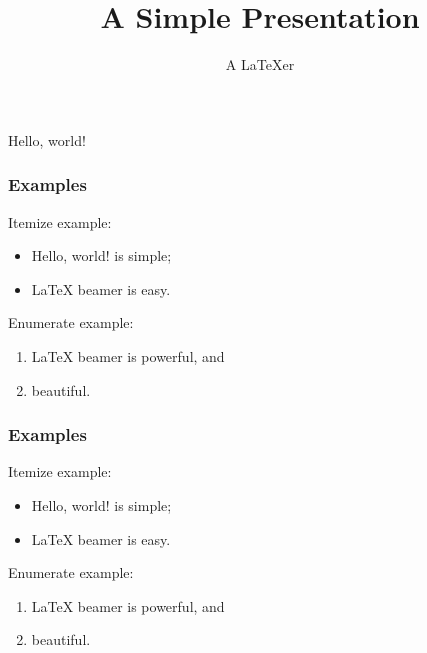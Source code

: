 \documentclass{beamer}
\begin{document}
\title{A Simple Presentation}
\author{A \LaTeX{}er}

\begin{frame}
  \titlepage
\end{frame}

\begin{frame}{Hello, world!}

\end{frame}

 \begin{frame}\frametitle{Examples}
   Itemize example:
   \begin{itemize}
   \item Hello, world! is simple;
   \item \LaTeX{} beamer is easy.
   \end{itemize}
   Enumerate example:
   \begin{enumerate}
   \item \LaTeX{} beamer is powerful, and
   \item beautiful.
   \end{enumerate}
 \end{frame}

 \begin{frame}\frametitle{Examples}
   \begin{example}
     Itemize example:
     \begin{itemize}
     \item Hello, world! is simple;
     \item \LaTeX{} beamer is easy.
     \end{itemize}
   \end{example}
   \begin{exampleblock}{Enumerate example:}
     \begin{enumerate}
     \item \LaTeX{} beamer is powerful, and
     \item beautiful.
     \end{enumerate}
   \end{exampleblock}
 \end{frame}
\end{document}
